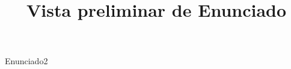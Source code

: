 \documentclass[a4paper,12pt]{article}\usepackage[spanish]{babel}\usepackage{times}
\title{Vista preliminar de Enunciado}
\begin{document}
\twocolumn 

\maketitle

Enunciado2
\end{document}
